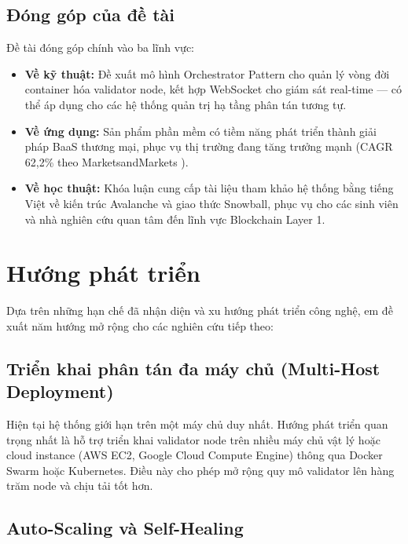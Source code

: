 \subsection{Đóng góp của đề tài}

Đề tài đóng góp chính vào ba lĩnh vực:

\begin{itemize}
    \item \textbf{Về kỹ thuật:} Đề xuất mô hình Orchestrator Pattern cho quản lý vòng đời container hóa validator node, kết hợp WebSocket cho giám sát real-time --- có thể áp dụng cho các hệ thống quản trị hạ tầng phân tán tương tự.

    \item \textbf{Về ứng dụng:} Sản phẩm phần mềm có tiềm năng phát triển thành giải pháp BaaS thương mại, phục vụ thị trường đang tăng trưởng mạnh (CAGR 62,2\% theo MarketsandMarkets \cite{marketsandmarkets2021baas}).

    \item \textbf{Về học thuật:} Khóa luận cung cấp tài liệu tham khảo hệ thống bằng tiếng Việt về kiến trúc Avalanche và giao thức Snowball, phục vụ cho các sinh viên và nhà nghiên cứu quan tâm đến lĩnh vực Blockchain Layer 1.
\end{itemize}

\section{Hướng phát triển}

Dựa trên những hạn chế đã nhận diện và xu hướng phát triển công nghệ, em đề xuất năm hướng mở rộng cho các nghiên cứu tiếp theo:

\subsection{Triển khai phân tán đa máy chủ (Multi-Host Deployment)}

Hiện tại hệ thống giới hạn trên một máy chủ duy nhất. Hướng phát triển quan trọng nhất là hỗ trợ triển khai validator node trên nhiều máy chủ vật lý hoặc cloud instance (AWS EC2, Google Cloud Compute Engine) thông qua Docker Swarm hoặc Kubernetes. Điều này cho phép mở rộng quy mô validator lên hàng trăm node và chịu tải tốt hơn.

\subsection{Auto-Scaling và Self-Healing}

